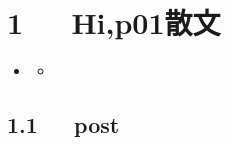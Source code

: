\documentclass[letterpaper,10pt,english]{sphinxmanual}
\begin{document}
\chapter{1   Hi,p01散文}
\label{\detokenize{p01_u6563_u6587/Hello_uff0cp01_u6563_u6587:hi-p01}}\label{\detokenize{p01_u6563_u6587/Hello_uff0cp01_u6563_u6587::doc}}
\begin{sphinxShadowBox}
\begin{itemize}
\item {} 
\label{\detokenize{p01_u6563_u6587/Hello_uff0cp01_u6563_u6587:id2}}{\hyperref[\detokenize{p01_u6563_u6587/Hello_uff0cp01_u6563_u6587:hi-p01}]{}}
\begin{itemize}
\item {} 
\label{\detokenize{p01_u6563_u6587/Hello_uff0cp01_u6563_u6587:id3}}{\hyperref[\detokenize{p01_u6563_u6587/Hello_uff0cp01_u6563_u6587:post}]{}}

\end{itemize}

\end{itemize}
\end{sphinxShadowBox}


\section{1.1   post}
\label{\detokenize{p01_u6563_u6587/Hello_uff0cp01_u6563_u6587:post}}
\end{document}
